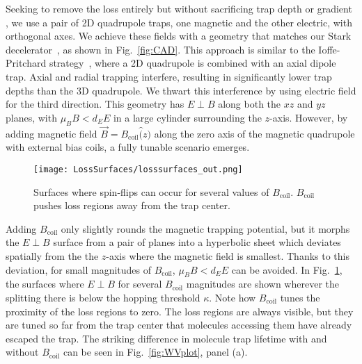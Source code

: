 \documentclass[%
 reprint,
groupedaddress,
 amsmath,amssymb,
 aps,
prl,
]{revtex4-1}
\newcommand{\epb}{$E\!\perp\!B$}
\begin{document}
Seeking to remove the loss entirely but without sacrificing trap depth or gradient , we use a pair of 2D quadrupole traps, one magnetic and the other electric, with orthogonal axes. We achieve these fields with a geometry that matches our Stark decelerator~\cite{Bochinski2003}, as shown in Fig.~\ref{fig:CAD}. This approach is similar to the Ioffe-Pritchard strategy~\cite{pritchard1983}, where a 2D quadrupole is combined with an axial dipole trap. Axial and radial trapping interfere, resulting in significantly lower trap depths than the 3D quadrupole. We thwart this interference by using electric field for the third direction. This geometry has \epb{} along both the $xz$ and $yz$ planes, with $\mu_BB < d_EE$ in a large cylinder surrounding the $z$-axis. However, by adding magnetic field $\vec{B}=B_\text{coil}\hat(z)$ along the zero axis of the magnetic quadrupole with external bias coils, a fully tunable scenario emerges. %


\begin{figure}[tb]
\texttt{[image: LossSurfaces/losssurfaces\_out.png]}%
\caption{
Surfaces where spin-flips can occur for several values of $B_\text{coil}$. $B_\text{coil}$ pushes loss regions away from the trap center.
\label{fig:LSurfs}}
\end{figure}

Adding $B_\text{coil}$ only slightly rounds the magnetic trapping potential, but it morphs the \epb{} surface from a pair of planes into a hyperbolic sheet which deviates spatially from the the $z$-axis where the magnetic field is smallest. Thanks to this deviation, for small magnitudes of $B_\text{coil}$, $\mu_BB< d_EE$ can be avoided. In Fig.~\ref{fig:LSurfs}, the surfaces where \epb{} for several $B_\text{coil}$ magnitudes are shown wherever the splitting there is below the hopping threshold $\kappa$. Note how $B_\text{coil}$ tunes the proximity of the loss regions to zero. The loss regions are always visible, but they are tuned so far from the trap center that molecules accessing them have already escaped the trap. The striking difference in molecule trap lifetime with and without $B_\text{coil}$ can be seen in Fig.~\ref{fig:WVplot}, panel (a).
\end{document}
